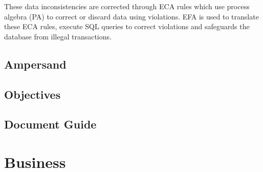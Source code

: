 \documentclass[journal,12pt,onecolumn,draftclsnofoot]{article}
\let\Oldsubsection\subsection
\renewcommand{\subsection}{\FloatBarrier\Oldsubsection}
\begin{document}
These data inconsistencies are corrected through ECA rules which use process 
algebra (PA) to correct or discard data using violations. EFA is used to 
translate these ECA rules, execute SQL queries to correct violations and 
safeguards the database from illegal transactions.
\subsection*{Ampersand}
\subsection*{Objectives}
\subsection*{Document Guide}

\section{Business}\label{BusinessSect}





\newpage



\end{document}

